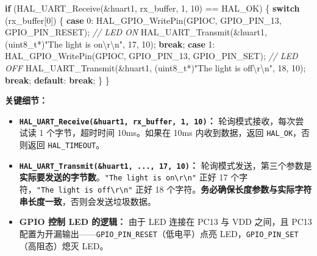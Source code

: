 \documentclass[
  chinese,
  UTF8,
  oneside,
  openany]{ctexbook}
\newenvironment{Shaded}{}{}
\newcommand{\CharTok}[1]{\textcolor[rgb]{0.25,0.44,0.63}{#1}}
\newcommand{\CommentTok}[1]{\textcolor[rgb]{0.38,0.63,0.69}{\textit{#1}}}
\newcommand{\ControlFlowTok}[1]{\textcolor[rgb]{0.00,0.44,0.13}{\textbf{#1}}}
\newcommand{\DataTypeTok}[1]{\textcolor[rgb]{0.56,0.13,0.00}{#1}}
\newcommand{\DecValTok}[1]{\textcolor[rgb]{0.25,0.63,0.44}{#1}}
\newcommand{\NormalTok}[1]{#1}
\newcommand{\OperatorTok}[1]{\textcolor[rgb]{0.40,0.40,0.40}{#1}}
\newcommand{\SpecialCharTok}[1]{\textcolor[rgb]{0.25,0.44,0.63}{#1}}
\newcommand{\StringTok}[1]{\textcolor[rgb]{0.25,0.44,0.63}{#1}}
\providecommand{\tightlist}{%
  \setlength{\itemsep}{0pt}\setlength{\parskip}{0pt}}
\begin{document}
\begin{Shaded}
\begin{Highlighting}[]
\ControlFlowTok{if} \OperatorTok{(}\NormalTok{HAL\_UART\_Receive}\OperatorTok{(\&}\NormalTok{huart1}\OperatorTok{,}\NormalTok{ rx\_buffer}\OperatorTok{,} \DecValTok{1}\OperatorTok{,} \DecValTok{10}\OperatorTok{)} \OperatorTok{==}\NormalTok{ HAL\_OK}\OperatorTok{)} \OperatorTok{\{}
    \ControlFlowTok{switch} \OperatorTok{(}\NormalTok{rx\_buffer}\OperatorTok{[}\DecValTok{0}\OperatorTok{])} \OperatorTok{\{}
        \ControlFlowTok{case} \CharTok{\textquotesingle{}0\textquotesingle{}}\OperatorTok{:}
\NormalTok{            HAL\_GPIO\_WritePin}\OperatorTok{(}\NormalTok{GPIOC}\OperatorTok{,}\NormalTok{ GPIO\_PIN\_13}\OperatorTok{,}\NormalTok{ GPIO\_PIN\_RESET}\OperatorTok{);}  \CommentTok{// LED ON}
\NormalTok{            HAL\_UART\_Transmit}\OperatorTok{(\&}\NormalTok{huart1}\OperatorTok{,} \OperatorTok{(}\DataTypeTok{uint8\_t}\OperatorTok{*)}\StringTok{"The light is on}\SpecialCharTok{\textbackslash{}r\textbackslash{}n}\StringTok{"}\OperatorTok{,} \DecValTok{17}\OperatorTok{,} \DecValTok{10}\OperatorTok{);}
            \ControlFlowTok{break}\OperatorTok{;}
        \ControlFlowTok{case} \CharTok{\textquotesingle{}1\textquotesingle{}}\OperatorTok{:}
\NormalTok{            HAL\_GPIO\_WritePin}\OperatorTok{(}\NormalTok{GPIOC}\OperatorTok{,}\NormalTok{ GPIO\_PIN\_13}\OperatorTok{,}\NormalTok{ GPIO\_PIN\_SET}\OperatorTok{);}    \CommentTok{// LED OFF}
\NormalTok{            HAL\_UART\_Transmit}\OperatorTok{(\&}\NormalTok{huart1}\OperatorTok{,} \OperatorTok{(}\DataTypeTok{uint8\_t}\OperatorTok{*)}\StringTok{"The light is off}\SpecialCharTok{\textbackslash{}r\textbackslash{}n}\StringTok{"}\OperatorTok{,} \DecValTok{18}\OperatorTok{,} \DecValTok{10}\OperatorTok{);}
            \ControlFlowTok{break}\OperatorTok{;}
        \ControlFlowTok{default}\OperatorTok{:}
            \ControlFlowTok{break}\OperatorTok{;}
    \OperatorTok{\}}
\OperatorTok{\}}
\end{Highlighting}
\end{Shaded}

\textbf{关键细节：}

\begin{itemize}
\tightlist
\item
  \textbf{\texttt{HAL\_UART\_Receive(\&huart1,\ rx\_buffer,\ 1,\ 10)}：}
  轮询模式接收，每次尝试读 1 个字节，超时时间 10ms。如果在 10ms
  内收到数据，返回 \texttt{HAL\_OK}，否则返回 \texttt{HAL\_TIMEOUT}。
\item
  \textbf{\texttt{HAL\_UART\_Transmit(\&huart1,\ ...,\ 17,\ 10)}：}
  轮询模式发送，第三个参数是\textbf{实际要发送的字节数}。\texttt{"The\ light\ is\ on\textbackslash{}r\textbackslash{}n"}
  正好 17
  个字符，\texttt{"The\ light\ is\ off\textbackslash{}r\textbackslash{}n"}
  正好 18
  个字符。\textbf{务必确保长度参数与实际字符串长度一致}，否则会发送垃圾数据。
\item
  \textbf{GPIO 控制 LED 的逻辑：} 由于 LED 连接在 PC13 与 VDD 之间，且
  PC13 配置为开漏输出------\texttt{GPIO\_PIN\_RESET}（低电平）点亮
  LED，\texttt{GPIO\_PIN\_SET}（高阻态）熄灭 LED。
\end{itemize}
\end{document}

